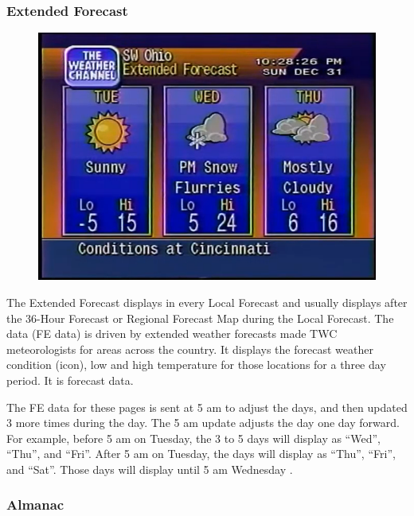 \documentclass[a4paper,11pt]{refart}
\begin{document}
\subsubsection*{Extended Forecast}

\begin{figure}[ht!]\centering
\includegraphics[width=\textwidth]{img/ext-forc.png}
\end{figure}

The Extended Forecast displays in every Local Forecast and usually displays after the 36-Hour Forecast or Regional Forecast Map during the Local Forecast. The data (FE data) is driven by extended weather forecasts made TWC meteorologists for areas across the country. It displays the forecast weather condition (icon), low and high temperature for those locations for a three day period. It is forecast data.

The FE data for these pages is sent at 5 am to adjust the days, and then updated 3 more times during the day. The 5 am update adjusts the day one day forward. For example, before 5 am on Tuesday, the 3 to 5 days will display as “Wed”, “Thu”, and “Fri”. After 5 am on Tuesday, the days will display as “Thu”, “Fri”, and “Sat”. Those days will display until 5 am Wednesday \cite{WS4KProdGde}.

\subsubsection*{Almanac}
\end{document}
